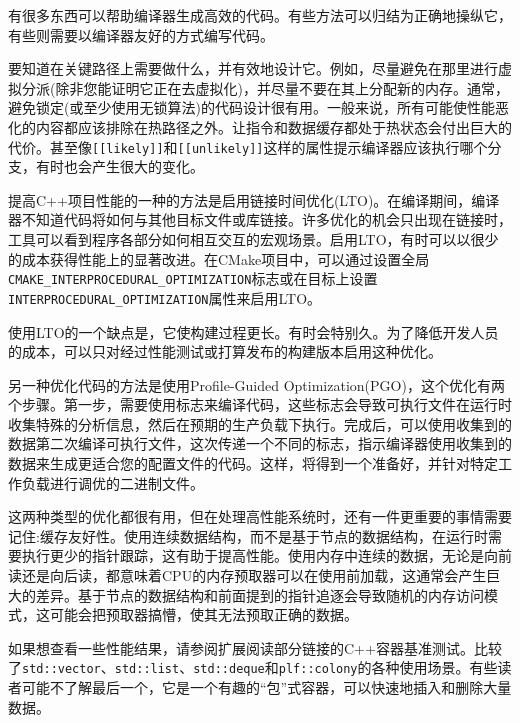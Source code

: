 
有很多东西可以帮助编译器生成高效的代码。有些方法可以归结为正确地操纵它，有些则需要以编译器友好的方式编写代码。

要知道在关键路径上需要做什么，并有效地设计它。例如，尽量避免在那里进行虚拟分派(除非您能证明它正在去虚拟化)，并尽量不要在其上分配新的内存。通常，避免锁定(或至少使用无锁算法)的代码设计很有用。一般来说，所有可能使性能恶化的内容都应该排除在热路径之外。让指令和数据缓存都处于热状态会付出巨大的代价。甚至像\texttt{[[likely]]}和\texttt{[[unlikely]]}这样的属性提示编译器应该执行哪个分支，有时也会产生很大的变化。


提高C++项目性能的一种的方法是启用链接时间优化(LTO)。在编译期间，编译器不知道代码将如何与其他目标文件或库链接。许多优化的机会只出现在链接时，工具可以看到程序各部分如何相互交互的宏观场景。启用LTO，有时可以以很少的成本获得性能上的显著改进。在CMake项目中，可以通过设置全局\texttt{CMAKE\_INTERPROCEDURAL\_OPTIMIZATION}标志或在目标上设置\texttt{INTERPROCEDURAL\_OPTIMIZATION}属性来启用LTO。

使用LTO的一个缺点是，它使构建过程更长。有时会特别久。为了降低开发人员的成本，可以只对经过性能测试或打算发布的构建版本启用这种优化。


另一种优化代码的方法是使用Profile-Guided Optimization(PGO)，这个优化有两个步骤。第一步，需要使用标志来编译代码，这些标志会导致可执行文件在运行时收集特殊的分析信息，然后在预期的生产负载下执行。完成后，可以使用收集到的数据第二次编译可执行文件，这次传递一个不同的标志，指示编译器使用收集到的数据来生成更适合您的配置文件的代码。这样，将得到一个准备好，并针对特定工作负载进行调优的二进制文件。


这两种类型的优化都很有用，但在处理高性能系统时，还有一件更重要的事情需要记住:缓存友好性。使用连续数据结构，而不是基于节点的数据结构，在运行时需要执行更少的指针跟踪，这有助于提高性能。使用内存中连续的数据，无论是向前读还是向后读，都意味着CPU的内存预取器可以在使用前加载，这通常会产生巨大的差异。基于节点的数据结构和前面提到的指针追逐会导致随机的内存访问模式，这可能会把预取器搞懵，使其无法预取正确的数据。

如果想查看一些性能结果，请参阅扩展阅读部分链接的C++容器基准测试。比较了\texttt{std::vector}、\texttt{std::list}、\texttt{std::deque}和\texttt{plf::colony}的各种使用场景。有些读者可能不了解最后一个，它是一个有趣的“包”式容器，可以快速地插入和删除大量数据。

